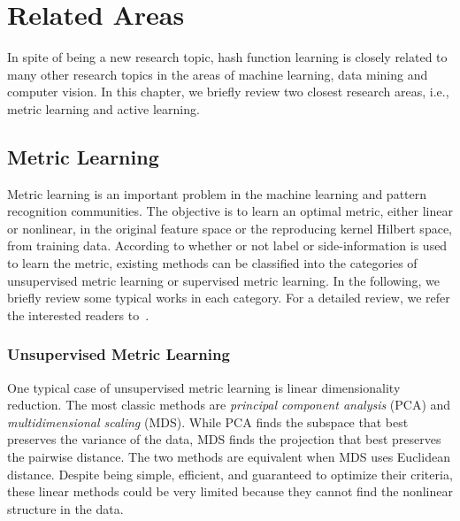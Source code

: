 \chapter{Related Areas}
\label{chap:relatedareas}
In spite of being a new research topic, hash function learning is closely related to many other research topics in the areas of machine learning, data mining and computer vision. In this chapter, we briefly review two closest research areas, i.e., metric learning and active learning.

\section{Metric Learning}
Metric learning is an important problem in the machine learning and pattern recognition communities. The objective is to learn an optimal metric, either linear or nonlinear, in the original feature space or the reproducing kernel Hilbert
space, from training data. According to whether or not label or side-information is used to learn the metric, existing methods can be classified into the categories of unsupervised metric learning or supervised metric learning. In the following, we briefly review some typical works in each category. For a detailed review, we refer the interested readers to~\cite{yang2006tech}.

\subsection{Unsupervised Metric Learning}
One typical case of unsupervised metric learning is linear dimensionality reduction. The most classic methods are \textit{principal component analysis} (\mbox{PCA}) and \textit{multidimensional scaling} (\mbox{MDS}). While \mbox{PCA} finds the subspace that best preserves the variance of the data, \mbox{MDS} finds the projection that best preserves the pairwise distance. The two methods are equivalent when \mbox{MDS} uses Euclidean distance. Despite being simple, efficient, and guaranteed to optimize their criteria, these linear methods could be very limited because they cannot find the nonlinear structure in the data.

